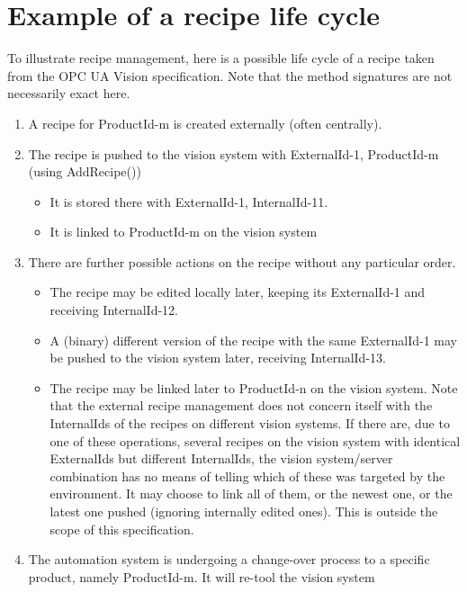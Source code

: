 \chapter{Example of a recipe life cycle}
To illustrate recipe management, here is a possible life cycle of a recipe taken from the OPC UA Vision specification. \cite{VDMA2018OPCSpecification} Note that the method signatures are not necessarily exact here. 
\begin{enumerate}
    \item A recipe for ProductId-m is created externally (often centrally). 
    \item The recipe is pushed to the vision system with ExternalId-1, ProductId-m (using AddRecipe())
    \begin{itemize}
        \item It is stored there with ExternalId-1, InternalId-11.
        \item It is linked to ProductId-m on the vision system
    \end{itemize}
    \item There are further possible actions on the recipe without any particular order.
    \begin{itemize}
        \item The recipe may be edited locally later, keeping its ExternalId-1 and receiving InternalId-12.
        \item A (binary) different version of the recipe with the same ExternalId-1 may be pushed to the vision system later, receiving InternalId-13.
        \item The recipe may be linked later to ProductId-n on the vision system. Note that the external recipe 
        management does not concern itself with the InternalIds of the recipes on different vision systems. If 
        there are, due to one of these operations, several recipes on the vision system with identical 
        ExternalIds but different InternalIds, the vision system/server combination has no means of telling 
        which of these was targeted by the environment. It may choose to link all of them, or the newest one, 
        or the latest one pushed (ignoring internally edited ones). This is outside the scope of this specification.
    \end{itemize}
    \item The automation system is undergoing a change-over process to a specific product, namely ProductId-m. It 
    will re-tool the vision system
    \begin{itemize}

\end{itemize}
\end{enumerate}
